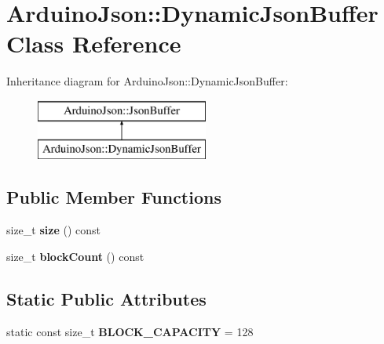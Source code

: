\hypertarget{class_arduino_json_1_1_dynamic_json_buffer}{}\section{Arduino\+Json\+:\+:Dynamic\+Json\+Buffer Class Reference}
\label{class_arduino_json_1_1_dynamic_json_buffer}
Inheritance diagram for Arduino\+Json\+:\+:Dynamic\+Json\+Buffer\+:\begin{figure}[H]
\begin{center}
\leavevmode
\includegraphics[height=2.000000cm]{class_arduino_json_1_1_dynamic_json_buffer}
\end{center}
\end{figure}
\subsection*{Public Member Functions}
\begin{DoxyCompactItemize}
\item 
\hypertarget{class_arduino_json_1_1_dynamic_json_buffer_a584f47a4b7272d8bc95b055e49130128}{}size\+\_\+t {\bfseries size} () const \label{class_arduino_json_1_1_dynamic_json_buffer_a584f47a4b7272d8bc95b055e49130128}

\item 
\hypertarget{class_arduino_json_1_1_dynamic_json_buffer_ad211820641812756fc310267d24ae587}{}size\+\_\+t {\bfseries block\+Count} () const \label{class_arduino_json_1_1_dynamic_json_buffer_ad211820641812756fc310267d24ae587}

\end{DoxyCompactItemize}
\subsection*{Static Public Attributes}
\begin{DoxyCompactItemize}
\item 
\hypertarget{class_arduino_json_1_1_dynamic_json_buffer_a88eb6738f9e6f66d1b1d5907220c3583}{}static const size\+\_\+t {\bfseries B\+L\+O\+C\+K\+\_\+\+C\+A\+P\+A\+C\+I\+T\+Y} = 128\label{class_arduino_json_1_1_dynamic_json_buffer_a88eb6738f9e6f66d1b1d5907220c3583}

\end{DoxyCompactItemize}
